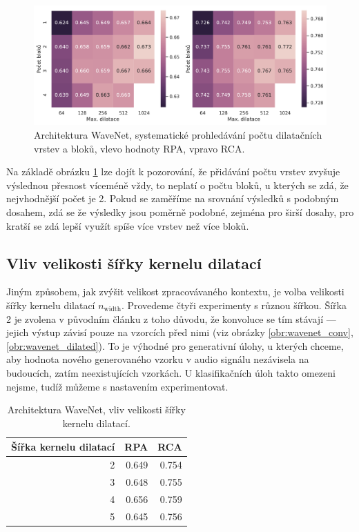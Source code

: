 \begin{figure}[h]\centering
    \includegraphics[scale=0.5]{../img/figures/wavenet_stacks_gridsearch.pdf}
\caption{Architektura WaveNet, systematické prohledávání počtu dilatačních vrstev a bloků, vlevo hodnoty RPA, vpravo RCA.}\label{obr:wavenet_stacks_gridsearch}
\end{figure}

Na základě obrázku \ref{obr:wavenet_stacks_gridsearch} lze dojít k pozorování, že přidávání počtu vrstev zvyšuje výslednou přesnost víceméně vždy, to neplatí o počtu bloků, u kterých se zdá, že nejvhodnější počet je 2. Pokud se zaměříme na srovnání výsledků s podobným dosahem, zdá se že výsledky jsou poměrně podobné, zejména pro širší dosahy, pro kratší se zdá lepší využít spíše více vrstev než více bloků. 

\subsection{Vliv velikosti šířky kernelu dilatací}

Jiným způsobem, jak zvýšit velikost zpracovávaného kontextu, je volba velikosti šířky kernelu dilatací $n_{\mathrm{width}}$. Provedeme čtyři experimenty s různou šířkou. Šířka 2 je zvolena v původním článku z toho důvodu, že konvoluce se tím stávají  --- jejich výstup závisí pouze na vzorcích před nimi (viz obrázky \ref{obr:wavenet_conv}, \ref{obr:wavenet_dilated}). To je výhodné pro generativní úlohy, u kterých chceme, aby hodnota nového generovaného vzorku v audio signálu nezávisela na budoucích, zatím neexistujících vzorkách. U klasifikačních úloh takto omezeni nejsme, tudíž můžeme s nastavením experimentovat. 

\begin{table}[h!]
\centering
    \begin{tabular}{rrr}
    \toprule
    Šířka kernelu dilatací &   RPA &   RCA \\
    \midrule
                        2 & 0.649 & 0.754 \\
                        3 & 0.648 & 0.755 \\
                        4 & 0.656 & 0.759 \\
                        5 & 0.645 & 0.756 \\
    \bottomrule
    \end{tabular}
\caption{Architektura WaveNet, vliv velikosti šířky kernelu dilatací.}\label{tab:wavenet_dilation_width}
\end{table}

